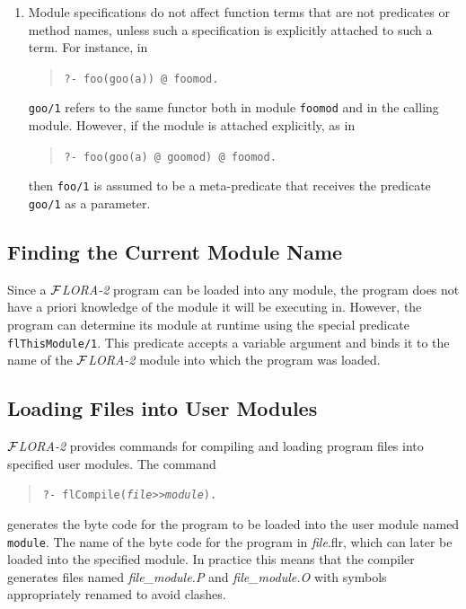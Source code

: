 \documentclass[11pt]{article}
\newcommand{\FLORA}{{\mbox{${\cal F}${\small\it LORA}\rm\emph{-2}}}\xspace}
\begin{document}
\begin{enumerate}
\item Module specifications do not affect function terms that are not
  predicates or method names, unless such a specification is explicitly
  attached to such a term. For instance, in
  \begin{quote}
    \verb|?- foo(goo(a)) @ foomod.|
  \end{quote}
  {\tt goo/1} refers to the same functor both in module {\tt foomod} and in
  the calling module. However, if the module is attached explicitly, as in
  \begin{quote}
    \verb|?- foo(goo(a) @ goomod) @ foomod.|
  \end{quote}
  then {\tt foo/1} is assumed to be a meta-predicate that receives the
  predicate {\tt goo/1}  as a parameter.
\end{enumerate}


\subsection{Finding the Current Module Name}

%
Since a \FLORA program can be loaded into any module, the program does not
have a priori knowledge of the module it will be executing in. However, the
program can determine its module at runtime using the special predicate
{\tt flThisModule/1}.  This predicate accepts a variable argument and binds
it to the name of the \FLORA module into which the program was loaded.



\subsection{Loading Files into User Modules}\label{sec-loading-mods}

%

\FLORA provides commands for compiling and loading program files into
specified user modules.
The
command 
\begin{quote}
  {\tt ?- flCompile({\it file}>>{\it module}).}
\end{quote}
generates the byte code for the program to be loaded into the user module
named {\tt module}. The name of the byte code for the program in
\emph{file}.flr, which can later be loaded into the specified module. In
practice this means that the compiler generates files named
\emph{file\_module.P} and \emph{file\_module.O} with symbols appropriately
renamed to avoid clashes.
\end{document}
